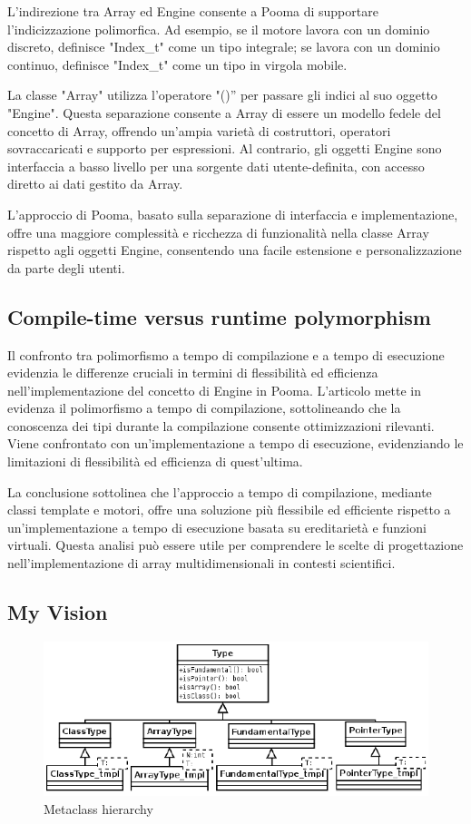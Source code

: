\documentclass[11pt]{article}
\begin{document}
\begin{multicols*}{2}[\columnsep=1cm]
    L'indirezione tra Array ed Engine consente a Pooma di supportare l'indicizzazione polimorfica. Ad esempio, se il motore lavora con un dominio discreto, definisce "Index\_t" come un tipo integrale; se lavora con un dominio continuo, definisce "Index\_t" come un tipo in virgola mobile.

    La classe "Array" utilizza l'operatore "()” per passare gli indici al suo oggetto "Engine". Questa separazione consente a Array di essere un modello fedele del concetto di Array, offrendo un'ampia varietà di costruttori, operatori sovraccaricati e supporto per espressioni. Al contrario, gli oggetti Engine sono interfaccia a basso livello per una sorgente dati utente-definita, con accesso diretto ai dati gestito da Array.

    L'approccio di Pooma, basato sulla separazione di interfaccia e implementazione, offre una maggiore complessità e ricchezza di funzionalità nella classe Array rispetto agli oggetti Engine, consentendo una facile estensione e personalizzazione da parte degli utenti.
    
    \subsection{Compile-time versus runtime polymorphism}
    Il confronto tra polimorfismo a tempo di compilazione e a tempo di esecuzione evidenzia le differenze cruciali in termini di flessibilità ed efficienza nell'implementazione del concetto di Engine in Pooma.
    L'articolo mette in evidenza il polimorfismo a tempo di compilazione, sottolineando che la conoscenza dei tipi durante la compilazione consente ottimizzazioni rilevanti. Viene confrontato con un'implementazione a tempo di esecuzione, evidenziando le limitazioni di flessibilità ed efficienza di quest'ultima.

    La conclusione sottolinea che l'approccio a tempo di compilazione, mediante classi template e motori, offre una soluzione più flessibile ed efficiente rispetto a un'implementazione a tempo di esecuzione basata su ereditarietà e funzioni virtuali. Questa analisi può essere utile per comprendere le scelte di progettazione nell'implementazione di array multidimensionali in contesti scientifici.
    \subsection{My Vision}
\end{multicols*}

\begin{figure}
    \centering
    \includegraphics[width=0.5\linewidth]{ClassType.png}
    \caption{Metaclass hierarchy}
    \label{fig:ClassType}
\end{figure}

\printbibliography
\end{document}
